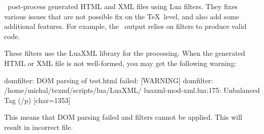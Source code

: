\texfourht\ post-process generated HTML and XML files using Lua filters. They fixes various issues that
are not possible fix on the \TeX\ level, and also add some additional features. For example, the \mathml\ 
output relies on filters to produce valid code.

These filters use the LuaXML library for the processing. When the generated HTML or XML file is not well-formed,
you may get the following warning:


\begin{shellcommand}
[WARNING] domfilter: DOM parsing of test.html failed:
[WARNING] domfilter: /home/michal/texmf/scripts/lua/LuaXML/
luaxml-mod-xml.lua:175: Unbalanced Tag (/p) [char=1353]
\end{shellcommand}

This means that DOM parsing failed and filters cannot be applied. This will result in incorrect file.


